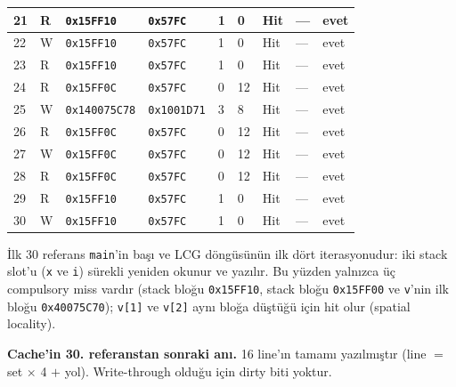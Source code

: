 \documentclass[11pt,a4paper]{article}
\newcommand{\tl}{\texttt}
\begin{document}
{\begin{longtable}{|p{0.5cm}|p{0.6cm}|p{2.2cm}|p{1.8cm}|p{0.9cm}|p{0.9cm}|p{1.0cm}|p{1.6cm}|p{3.2cm}|}
\hline
21 & R & \tl{0x15FF10} & \tl{0x57FC} & 1 & 0 & Hit & --- & evet\\
\hline
22 & W & \tl{0x15FF10} & \tl{0x57FC} & 1 & 0 & Hit & --- & evet\\
\hline
23 & R & \tl{0x15FF10} & \tl{0x57FC} & 1 & 0 & Hit & --- & evet\\
\hline
24 & R & \tl{0x15FF0C} & \tl{0x57FC} & 0 & 12 & Hit & --- & evet\\
\hline
25 & W & \tl{0x140075C78} & \tl{0x1001D71} & 3 & 8 & Hit & --- & evet\\
\hline
26 & R & \tl{0x15FF0C} & \tl{0x57FC} & 0 & 12 & Hit & --- & evet\\
\hline
27 & W & \tl{0x15FF0C} & \tl{0x57FC} & 0 & 12 & Hit & --- & evet\\
\hline
28 & R & \tl{0x15FF0C} & \tl{0x57FC} & 0 & 12 & Hit & --- & evet\\
\hline
29 & R & \tl{0x15FF10} & \tl{0x57FC} & 1 & 0 & Hit & --- & evet\\
\hline
30 & W & \tl{0x15FF10} & \tl{0x57FC} & 1 & 0 & Hit & --- & evet\\
\hline
\end{longtable}
}

İlk 30 referans \tl{main}'in başı ve LCG döngüsünün ilk dört iterasyonudur: iki stack slot'u
(\tl{x} ve \tl{i}) sürekli yeniden okunur ve yazılır. Bu yüzden yalnızca üç compulsory miss vardır
(stack bloğu \tl{0x15FF10}, stack bloğu \tl{0x15FF00} ve \tl{v}'nin ilk bloğu \tl{0x40075C70});
\tl{v[1]} ve \tl{v[2]} aynı bloğa düştüğü için hit olur (spatial locality).

\textbf{Cache'in 30. referanstan sonraki anı.} 16 line'ın tamamı yazılmıştır (line $=$ set
$\times$ 4 $+$ yol). Write-through olduğu için dirty biti yoktur.
\end{document}
